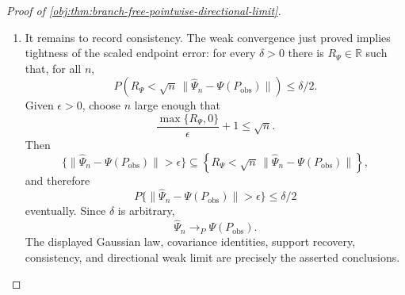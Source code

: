 \begin{proof}[Proof of \cref{obj:thm:branch-free-pointwise-directional-limit}]
\begin{enumerate}
\item It remains to record consistency. The weak convergence just proved implies tightness of the scaled endpoint error: for every \(\delta>0\) there is \(R_\Psi\in\mathbb R\) such that, for all \(n\),
\[
P\!\left(
R_\Psi<
\sqrt n\,\|\widehat\Psi_n-\Psi(P_{\mathrm{obs}})\|
\right)
\le \delta/2 .
\]
Given \(\epsilon>0\), choose \(n\) large enough that
\[
\frac{\max\{R_\Psi,0\}}{\epsilon}+1\le\sqrt n .
\]
Then
\[
\{\|\widehat\Psi_n-\Psi(P_{\mathrm{obs}})\|>\epsilon\}
\subseteq
\left\{
R_\Psi<
\sqrt n\,\|\widehat\Psi_n-\Psi(P_{\mathrm{obs}})\|
\right\},
\]
and therefore
\[
P\{\|\widehat\Psi_n-\Psi(P_{\mathrm{obs}})\|>\epsilon\}\le\delta/2
\]
eventually. Since \(\delta\) is arbitrary,
\[
\widehat\Psi_n\to_P\Psi(P_{\mathrm{obs}}).
\]
The displayed Gaussian law, covariance identities, support recovery, consistency, and directional weak limit are precisely the asserted conclusions. %
\end{enumerate}
\end{proof}

